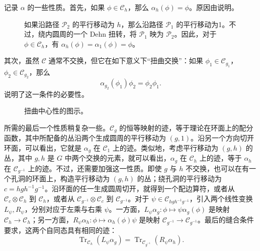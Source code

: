 记录 $\alpha$ 的一些性质。首先，如果 $\phi\in\mathcal{C}_h$，那么 $\alpha_h(\phi)=\phi$。原因由说明。

\begin{figure}[H]
\centering
{}
\caption{如果沿路径 $\mathcal{P}_2$ 的平行移动为 $h$，那么沿路径 $\mathcal{P}_1$ 的平行移动为1。不过，绕内圆周的一个 Dehn 扭转，将 $\mathcal{P}_1$ 映为 $\mathcal{P}_2$。因此，对于 $\phi\in\mathcal{C}_h$，有 $\alpha_h(\phi)=\alpha_1(\phi)=\phi$。}\label{fig:2.17}
\end{figure}

其次，虽然 $\mathcal{C}$ 通常不交换，但它在如下意义下“扭曲交换”：如果 $\phi_1\in\mathcal{C}_{g_1}$，$\phi_2\in\mathcal{C}_{g_2}$，那么
\begin{equation}\label{eq:2.82}
\alpha_{g_2}(\phi_1)\phi_2=\phi_2\phi_1.
\end{equation}
说明了这一条件的必要性。

\begin{figure}[H]
\centering
{}
\caption{扭曲中心性的图示。}\label{fig:2.18}
\end{figure}

所需的最后一个性质稍复杂一些。$\mathcal{C}_g$ 的恒等映射的迹，等于理论在环面上的配分函数，其中所配备的丛沿两个生成圆周的平行移动为 $(g,1)$。沿另一个方向切开环面，可以看出，它就是 $\alpha_g$ 在 $\mathcal{C}_1$ 上的迹。类似地，考虑平行移动为 $(g,h)$ 的丛，其中 $g,h$ 是 $G$ 中两个交换的元素，就可以看出，$\alpha_g$ 在 $\mathcal{C}_h$ 上的迹，等于 $\alpha_h$ 在 $\mathcal{C}_{g^{-1}}$ 上的迹。不过，还需要加强这一性质。即使 $g$ 与 $h$ 不交换，也可以在有一个孔洞的环面上，构造平行移动为 $(g,h)$ 的丛；绕孔洞的平行移动为 $c=hgh^{-1}g^{-1}$。沿环面的任一生成圆周切开，就得到一个配边算符，或者从 $\mathcal{C}_c\otimes\mathcal{C}_h$ 到 $\mathcal{C}_h$，或者从 $\mathcal{C}_{g^{-1}}\otimes\mathcal{C}_c$ 到 $\mathcal{C}_{g^{-1}}$。对于 $\psi\in\mathcal{C}_{hgh^{-1}g^{-1}}$，引入两个线性变换 $L_\psi,R_\psi$，分别对应于左乘与右乘 $\psi$。一方面，$L_\psi\alpha_g\colon\phi\mapsto\psi\alpha_g(\phi)$ 是映射 $\mathcal{C}_h\to\mathcal{C}_h$；另一方面，$R_\psi\alpha_h\colon\phi\mapsto\alpha_h(\phi)\psi$ 是映射 $\mathcal{C}_{g^{-1}}\to\mathcal{C}_{g^{-1}}$。最后的缝合条件要求，这两个自同态具有相同的迹：
\begin{equation}\label{eq:2.83}
\operatorname{Tr}_{\mathcal{C}_h}(L_\psi\alpha_g)
=\operatorname{Tr}_{\mathcal{C}_{g^{-1}}}(R_\psi\alpha_h).
\end{equation}

